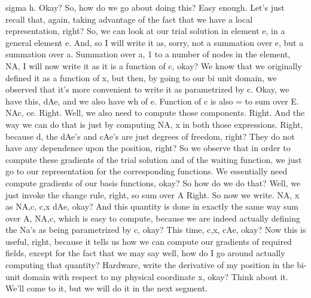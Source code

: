 \documentclass[10pt]{article}
\begin{document}
sigma h. Okay? So, how do we go about doing this? Easy enough. Let's just recall that, again, taking advantage of the fact that we have a local representation, right? So, we can look at our trial solution in element e, in a general element e. And, so I will write it as, sorry, not a summation over e, but a summation over a. Summation over a, 1 to a number of nodes in the element, NA, I will now write it as it is a function of c, okay? We know that we originally defined it as a function of x, but then, by going to our bi unit domain, we observed that it's more convenient to write it as parametrized by c. Okay, we have this, dAe, and we also have wh of e. Function of c is also = to sum over E. NAc, ce. Right. Well, we also need to compute those components. Right. And the way we can do that is just by computing NA, x in both those expressions. Right, because d, the dAe's and cAe's are just degrees of freedom, right? They do not have any dependence upon the position, right? So we observe that in order to compute these gradients of the trial solution and of the waiting function, we just go to our representation for the corresponding functions. We essentially need compute gradients of our basis functions, okay? So how do we do that? Well, we just invoke the change rule, right, so sum over A Right. So now we write. NA, x as NA,c, c,x dAe, okay? And this quantity is done in exactly the same way sum over A, NA,c, which is easy to compute, because we are indeed actually defining the Na's as being parametrized by c, okay? This time, c,x, cAe, okay? Now this is useful, right, because it tells us how we can compute our gradients of required fields, except for the fact that we may say well, how do I go around actually computing that quantity? Hardware, write the derivative of my position in the bi-unit domain with respect to my physical coordinate x, okay? Think about it. We'll come to it, but we will do it in the next segment.
\end{document}
